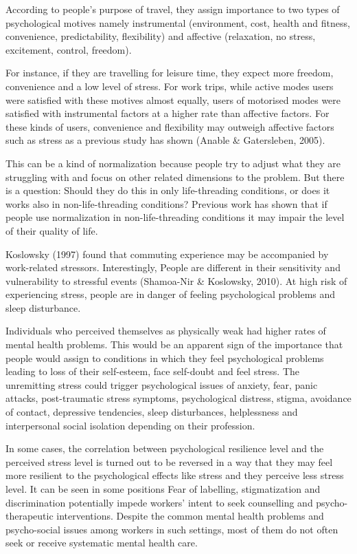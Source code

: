 \documentclass[
11pt, %
oneside, %
english, %
singlespacing, %
]{macthesis} %
\begin{document}
According to people's purpose of travel, they assign importance to two types of psychological motives namely instrumental (environment, cost, health and fitness, convenience, predictability, flexibility) and affective (relaxation, no stress, excitement, control, freedom).

For instance, if they are travelling for leisure time, they expect more freedom, convenience and a low level of stress. For work trips, while active modes users were satisfied with these motives almost equally, users of motorised modes were satisfied with instrumental factors at a higher rate than affective factors. For these kinds of users, convenience and flexibility may outweigh affective factors such as stress as a previous study has shown (Anable \& Gatersleben, 2005).

This can be a kind of normalization because people try to adjust what they are struggling with and focus on other related dimensions to the problem. But there is a question: Should they do this in only life-threading conditions, or does it works also in non-life-threading conditions? Previous work has shown that if people use normalization in non-life-threading conditions it may impair the level of their quality of life.

Koslowsky (1997) found that commuting experience may be accompanied by work-related stressors. Interestingly, People are different in their sensitivity and vulnerability to stressful events (Shamoa-Nir \& Koslowsky, 2010). At high risk of experiencing stress, people are in danger of feeling psychological problems and sleep disturbance.

Individuals who perceived themselves as physically weak had higher rates of mental health problems. This would be an apparent sign of the importance that people would assign to conditions in which they feel psychological problems leading to loss of their self-esteem, face self-doubt and feel stress. The unremitting stress could trigger psychological issues of anxiety, fear, panic attacks, post-traumatic stress symptoms, psychological distress, stigma, avoidance of contact, depressive tendencies, sleep disturbances, helplessness and interpersonal social isolation depending on their profession.

In some cases, the correlation between psychological resilience level and the perceived stress level is turned out to be reversed in a way that they may feel more resilient to the psychological effects like stress and they perceive less stress level. It can be seen in some positions Fear of labelling, stigmatization and discrimination potentially impede workers' intent to seek counselling and psycho-therapeutic interventions. Despite the common mental health problems and psycho-social issues among workers in such settings, most of them do not often seek or receive systematic mental health care.
\end{document}
